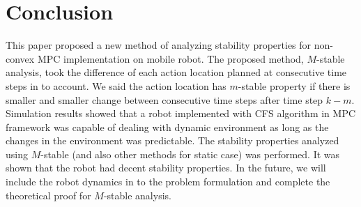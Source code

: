 \section{Conclusion}

This paper proposed a new method of analyzing stability properties for non-convex MPC implementation on mobile robot. The proposed method, $M$-stable analysis, took the difference of each action location planned at consecutive time steps in to account. We said the action location has $m$-stable property if there is smaller and smaller change between consecutive time steps after time step $k-m$. Simulation  results showed that a robot implemented with CFS algorithm in MPC framework was capable of dealing with dynamic environment as long as the changes in the environment was predictable. The stability properties analyzed using $M$-stable (and also other methods for static case) was performed. It was shown that the robot had decent stability properties. In the future, we will include the robot dynamics in to the problem formulation and complete the theoretical proof for $M$-stable analysis.





